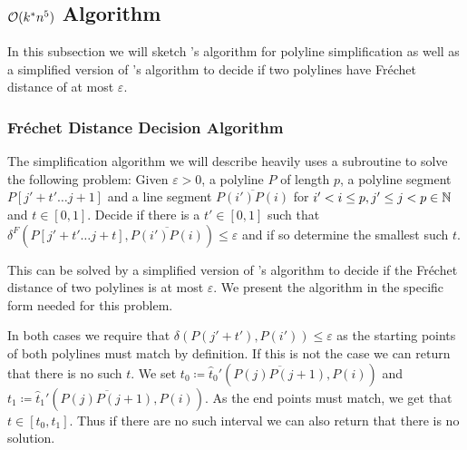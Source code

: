 \subsection{\(\mathcal{O}(k^*n^5)\) Algorithm}
\label{subsec:simple_algo}

In this subsection we will sketch \citeauthor{on_optimal_polyline_simplification_using_the_hausdorff_and_frechet_distance}'s algorithm for polyline simplification as well as a simplified version of \citeauthor{computing_the_frechet_distance_between_two_polygonal_curves}'s algorithm to decide if two polylines have Fréchet distance of at most \(\varepsilon\). 

\subsubsection{Fréchet Distance Decision Algorithm}
\label{ssec:alt_godau}
The simplification algorithm we will describe heavily uses a subroutine to solve the following problem: Given \(\varepsilon > 0\), a polyline \(P \) of length \(p\), a polyline segment \(P[j' + t' \dots j+1]\) and a line segment \(\overline{P(i')P(i)}\) for \(i' < i \leq p, j' \leq j < p\in \mathbb{N}\) and \(t \in [0, 1]\). Decide if there is a \(t' \in [0, 1]\) such that \(\delta^F(P[j' + t' \dots j + t], \overline{P(i')P(i)}) \leq \varepsilon\) and if so determine the smallest such \(t\).  

This can be solved by a simplified version of \citeauthor{computing_the_frechet_distance_between_two_polygonal_curves}'s algorithm to decide if the Fréchet distance of two polylines is at most \(\varepsilon\). We present the algorithm in the specific form needed for this problem. 

In both cases we require that \(\delta(P(j' + t'), P(i')) \leq \varepsilon\) as the starting points of both polylines must match by definition. If this is not the case we can return that there is no such \(t\). We set \(t_0 \coloneq \hat t_0'(\overline{P(j)P(j+1)}, P(i))\) and \(t_1 \coloneq \hat t_1'(\overline{P(j)P(j+1)}, P(i))\). As the end points must match, we get that \(t \in [t_0, t_1]\). Thus if there are no such interval we can also return that there is no solution.

